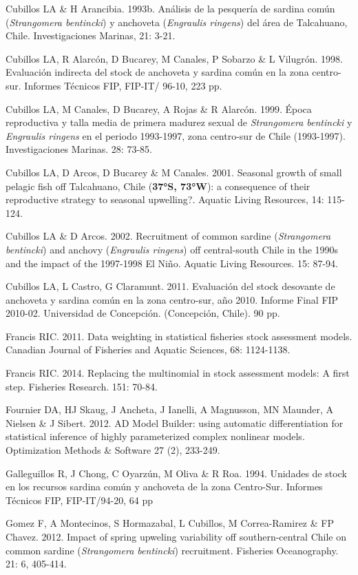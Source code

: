 \documentclass[
  spanish,
]{article}
\begin{document}
Cubillos LA \& H Arancibia. 1993b. Análisis de la pesquería de sardina
común (\emph{Strangomera bentincki}) y anchoveta (\emph{Engraulis
ringens}) del área de Talcahuano, Chile. Investigaciones Marinas, 21:
3-21.

Cubillos LA, R Alarcón, D Bucarey, M Canales, P Sobarzo \& L Vilugrón.
1998. Evaluación indirecta del stock de anchoveta y sardina común en la
zona centro-sur. Informes Técnicos FIP, FIP-IT/ 96-10, 223 pp.

Cubillos LA, M Canales, D Bucarey, A Rojas \& R Alarcón. 1999. Época
reproductiva y talla media de primera madurez sexual de
\emph{Strangomera bentincki} y \emph{Engraulis ringens} en el periodo
1993-1997, zona centro-sur de Chile (1993-1997). Investigaciones
Marinas. 28: 73-85.

Cubillos LA, D Arcos, D Bucarey \& M Canales. 2001. Seasonal growth of
small pelagic fish off Talcahuano, Chile (\textbf{37°S, 73°W}): a
consequence of their reproductive strategy to seasonal upwelling?.
Aquatic Living Resources, 14: 115-124.

Cubillos LA \& D Arcos. 2002. Recruitment of common sardine
(\emph{Strangomera bentincki}) and anchovy (\emph{Engraulis ringens})
off central-south Chile in the 1990s and the impact of the 1997-1998 El
Niño. Aquatic Living Resources. 15: 87-94.

Cubillos LA, L Castro, G Claramunt. 2011. Evaluación del stock desovante
de anchoveta y sardina común en la zona centro-sur, año 2010. Informe
Final FIP 2010-02. Universidad de Concepción. (Concepción, Chile). 90
pp.

Francis RIC. 2011. Data weighting in statistical fisheries stock
assessment models. Canadian Journal of Fisheries and Aquatic Sciences,
68: 1124-1138.

Francis RIC. 2014. Replacing the multinomial in stock assessment models:
A first step. Fisheries Research. 151: 70-84.

Fournier DA, HJ Skaug, J Ancheta, J Ianelli, A Magnusson, MN Maunder, A
Nielsen \& J Sibert. 2012. AD Model Builder: using automatic
differentiation for statistical inference of highly parameterized
complex nonlinear models. Optimization Methods \& Software 27 (2),
233-249.

Galleguillos R, J Chong, C Oyarzún, M Oliva \& R Roa. 1994. Unidades de
stock en los recursos sardina común y anchoveta de la zona Centro-Sur.
Informes Técnicos FIP, FIP-IT/94-20, 64 pp

Gomez F, A Montecinos, S Hormazabal, L Cubillos, M Correa-Ramirez \& FP
Chavez. 2012. Impact of spring upweling variability off southern-central
Chile on common sardine (\emph{Strangomera bentincki}) recruitment.
Fisheries Oceanography. 21: 6, 405-414.
\end{document}
